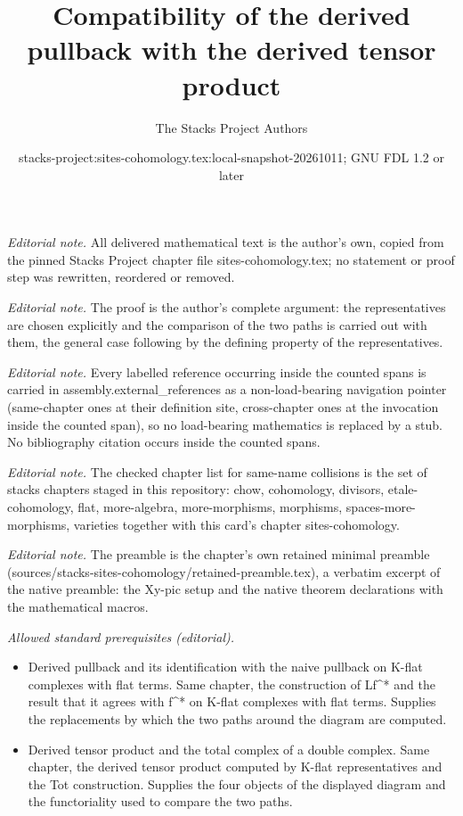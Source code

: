 \documentclass[10pt,a4paper]{amsart}
\title{Compatibility of the derived pullback with the derived tensor product}
\author{The Stacks Project Authors}
\date{stacks-project:sites-cohomology.tex:local-snapshot-20261011; GNU FDL 1.2 or later}
\theoremstyle{plain}
\theoremstyle{definition}
\theoremstyle{remark}
\numberwithin{equation}{subsection}
\begin{document}
\maketitle
\noindent\textit{Editorial note.} All delivered mathematical text is the author's own, copied from the pinned Stacks Project chapter file sites-cohomology.tex; no statement or proof step was rewritten, reordered or removed.\par\medskip
\noindent\textit{Editorial note.} The proof is the author's complete argument: the representatives are chosen explicitly and the comparison of the two paths is carried out with them, the general case following by the defining property of the representatives.\par\medskip
\noindent\textit{Editorial note.} Every labelled reference occurring inside the counted spans is carried in assembly.external\_references as a non-load-bearing navigation pointer (same-chapter ones at their definition site, cross-chapter ones at the invocation inside the counted span), so no load-bearing mathematics is replaced by a stub. No bibliography citation occurs inside the counted spans.\par\medskip
\noindent\textit{Editorial note.} The checked chapter list for same-name collisions is the set of stacks chapters staged in this repository: chow, cohomology, divisors, etale-cohomology, flat, more-algebra, more-morphisms, morphisms, spaces-more-morphisms, varieties together with this card's chapter sites-cohomology.\par\medskip
\noindent\textit{Editorial note.} The preamble is the chapter's own retained minimal preamble (sources/stacks-sites-cohomology/retained-preamble.tex), a verbatim excerpt of the native preamble: the Xy-pic setup and the native theorem declarations with the mathematical macros.\par\medskip
\noindent\textit{Allowed standard prerequisites (editorial).}\begin{itemize}
\item Derived pullback and its identification with the naive pullback on K-flat complexes with flat terms. Same chapter, the construction of Lf\textasciicircum{}* and the result that it agrees with f\textasciicircum{}* on K-flat complexes with flat terms. Supplies the replacements by which the two paths around the diagram are computed.
\item Derived tensor product and the total complex of a double complex. Same chapter, the derived tensor product computed by K-flat representatives and the Tot construction. Supplies the four objects of the displayed diagram and the functoriality used to compare the two paths.
\end{itemize}\medskip
\end{document}
